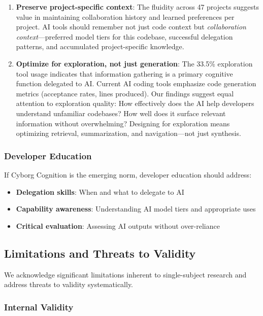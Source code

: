 \documentclass{ntlabs-preprint}
\begin{document}
\begin{enumerate}
    \item \textbf{Preserve project-specific context}: The fluidity across 47 projects suggests value in maintaining collaboration history and learned preferences per project. AI tools should remember not just code context but \textit{collaboration context}---preferred model tiers for this codebase, successful delegation patterns, and accumulated project-specific knowledge.

    \item \textbf{Optimize for exploration, not just generation}: The 33.5\% exploration tool usage indicates that information gathering is a primary cognitive function delegated to AI. Current AI coding tools emphasize code generation metrics (acceptance rates, lines produced). Our findings suggest equal attention to exploration quality: How effectively does the AI help developers understand unfamiliar codebases? How well does it surface relevant information without overwhelming? Designing for exploration means optimizing retrieval, summarization, and navigation---not just synthesis.
\end{enumerate}

\subsubsection{Developer Education}

If Cyborg Cognition is the emerging norm, developer education should address:
\begin{itemize}
    \item \textbf{Delegation skills}: When and what to delegate to AI
    \item \textbf{Capability awareness}: Understanding AI model tiers and appropriate uses
    \item \textbf{Critical evaluation}: Assessing AI outputs without over-reliance
\end{itemize}

\subsection{Limitations and Threats to Validity}

We acknowledge significant limitations inherent to single-subject research and address threats to validity systematically.

\subsubsection{Internal Validity}
\end{document}
